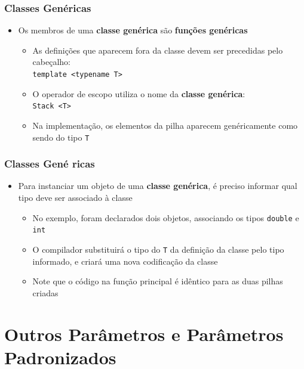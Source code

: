 \documentclass[aspectratio=169]{beamer}
\begin{document}
\begin{frame}\frametitle{Classes Genéricas}
\begin{itemize}
	\item Os membros de uma \textbf{classe genérica} são \textbf{funções genéricas}
	\begin{itemize}
		\item As definições que aparecem fora da classe devem ser precedidas pelo cabeçalho:\\
		\texttt{template \textless{}typename T\textgreater}
		\item O operador de escopo utiliza o nome da \textbf{classe genérica}:\\
		\texttt{Stack \textless{}T\textgreater}
		\item Na implementação, os elementos da pilha aparecem genéricamente como sendo do tipo \texttt{T}
	\end{itemize}
\end{itemize}
\end{frame}

\begin{frame}\frametitle{Classes Gené	ricas}
\begin{itemize}
	\item Para instanciar um objeto de uma \textbf{classe genérica}, é preciso informar qual tipo deve ser associado à classe
	\begin{itemize}
		\item No exemplo, foram declarados dois objetos, associando os tipos \texttt{double} e \texttt{int}
		\item O compilador substituirá o tipo do \texttt{T} da definição da classe pelo tipo informado, e criará uma nova codificação da classe
		\item Note que o código na função principal é idêntico para as duas pilhas criadas
	\end{itemize}
\end{itemize}
\end{frame}

\section{Outros Parâmetros e Parâmetros Padronizados}
\end{document}

